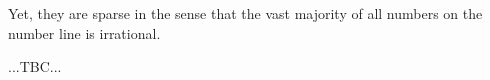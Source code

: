 Yet, they are sparse in the sense that the vast majority of all numbers on the number line is irrational.

...TBC...








